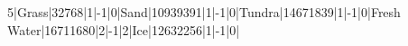 5|Grass|32768|1|-1|0|Sand|10939391|1|-1|0|Tundra|14671839|1|-1|0|Fresh Water|16711680|2|-1|2|Ice|12632256|1|-1|0|
